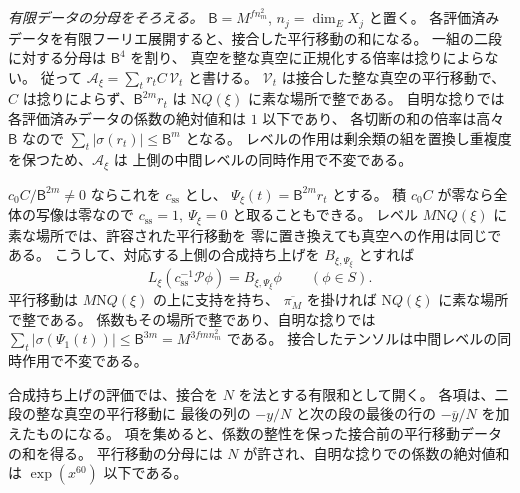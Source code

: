\emph{有限データの分母をそろえる。}
\(\mathsf B=M^{f n_m^2}\), \(n_j=\dim_E X_j\) と置く。
各評価済みデータを有限フーリエ展開すると、接合した平行移動の和になる。
一組の二段に対する分母は \(\mathsf B^4\) を割り、
真空を整な真空に正規化する倍率は捻りによらない。
従って \(\mathcal A_\xi=\sum_t r_t C\,\mathcal V_t\) と書ける。
\(\mathcal V_t\) は接合した整な真空の平行移動で、
\(C\) は捻りによらず、\(\mathsf B^{2m} r_t\) は
\(\mathrm NQ(\xi)\) に素な場所で整である。
自明な捻りでは各評価済みデータの係数の絶対値和は \(1\) 以下であり、
各切断の和の倍率は高々 \(\mathsf B\) なので
\(\sum_t|\sigma(r_t)|\le\mathsf B^m\) となる。
レベルの作用は剰余類の組を置換し重複度を保つため、\(\mathcal A_\xi\) は
上側の中間レベルの同時作用で不変である。

\(c_0C/\mathsf B^{2m}\ne0\) ならこれを \(c_{\mathrm{ss}}\) とし、
\(\Psi_\xi(t)=\mathsf B^{2m}r_t\) とする。
積 \(c_0C\) が零なら全体の写像は零なので
\(c_{\mathrm{ss}}=1,\ \Psi_\xi=0\) と取ることもできる。
レベル \(M\mathrm NQ(\xi)\) に素な場所では、許容された平行移動を
零に置き換えても真空への作用は同じである。
こうして、対応する上側の合成持ち上げを \(B_{\xi,\Psi_\xi}\) とすれば
\begin{equation}\label{eq:upper-seesaw}
 L_\xi(c_{\mathrm{ss}}^{-1}\mathcal P\phi)=B_{\xi,\Psi_\xi}\phi
 \qquad(\phi\in S).
\end{equation}
平行移動は \(M\mathrm NQ(\xi)\) の上に支持を持ち、
\(\overline{\pi_M}\) を掛ければ \(\mathrm NQ(\xi)\) に素な場所で整である。
係数もその場所で整であり、自明な捻りでは
\(\sum_t|\sigma(\Psi_1(t))|\le\mathsf B^{3m}=M^{3fmn_m^2}\) である。
接合したテンソルは中間レベルの同時作用で不変である。

合成持ち上げの評価では、接合を \(N\) を法とする有限和として開く。
各項は、二段の整な真空の平行移動に
最後の列の \(-y/N\) と次の段の最後の行の \(-\overline y/N\) を加えたものになる。
項を集めると、係数の整性を保った接合前の平行移動データの和を得る。
平行移動の分母には \(N\) が許され、自明な捻りでの係数の絶対値和は
\(\exp(x^{60})\) 以下である。

